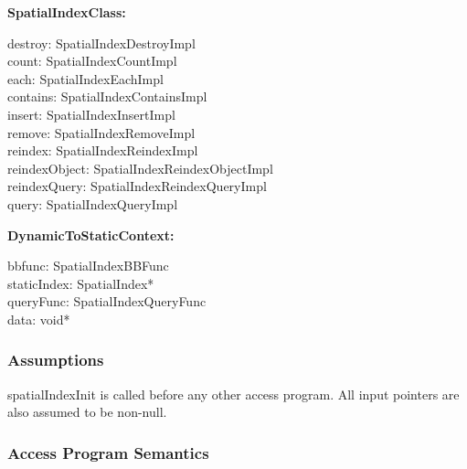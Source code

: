 \documentclass[12pt]{article}
\begin{document}
\noindent \textbf{SpatialIndexClass:} 
\begin{multicols}{2}
	\noindent destroy: SpatialIndexDestroyImpl \\
	count: SpatialIndexCountImpl \\
	each: SpatialIndexEachImpl \\
	contains: SpatialIndexContainsImpl \\
	insert: SpatialIndexInsertImpl \\
	remove: SpatialIndexRemoveImpl \\
	reindex: SpatialIndexReindexImpl \\
	reindexObject: SpatialIndexReindexObjectImpl \\
	reindexQuery: SpatialIndexReindexQueryImpl \\
	query: SpatialIndexQueryImpl
\end{multicols}

\pagebreak %

\noindent \textbf{DynamicToStaticContext:} 
\begin{multicols}{2}
	\noindent bbfunc: SpatialIndexBBFunc \\
	staticIndex: SpatialIndex* \\
	queryFunc: SpatialIndexQueryFunc \\
	data: void*
\end{multicols}


\subsubsection{Assumptions} \label{SecASpatial}
	spatialIndexInit is called before any other access program. All input pointers are also assumed to be non-null.

\subsubsection{Access Program Semantics} \label{SecAPSSpatial}
\end{document}
